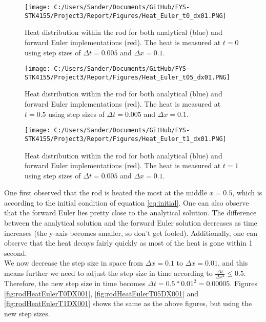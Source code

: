 \documentclass[12pt,a4paper]{article}
\begin{document}
\begin{figure}[H]
\centering
\texttt{[image: C:/Users/Sander/Documents/GitHub/FYS-STK4155/Project3/Report/Figures/Heat\_Euler\_t0\_dx01.PNG]}
\caption{\label{fig:rodHeatEulerT0DX01} Heat distribution within the rod for both analytical (blue) and forward Euler implementations (red). The heat is measured at $t = 0$ using step sizes of $\Delta t = 0.005$ and $\Delta x = 0.1$.}
\end{figure}

\begin{figure}[H]
\centering
\texttt{[image: C:/Users/Sander/Documents/GitHub/FYS-STK4155/Project3/Report/Figures/Heat\_Euler\_t05\_dx01.PNG]}
\caption{\label{fig:rodHeatEulerT05DX01} Heat distribution within the rod for both analytical (blue) and forward Euler implementations (red). The heat is measured at $t = 0.5$ using step sizes of $\Delta t = 0.005$ and $\Delta x = 0.1$.}
\end{figure}

\begin{figure}[H]
\centering
\texttt{[image: C:/Users/Sander/Documents/GitHub/FYS-STK4155/Project3/Report/Figures/Heat\_Euler\_t1\_dx01.PNG]}
\caption{\label{fig:rodHeatEulerT1DX01} Heat distribution within the rod for both analytical (blue) and forward Euler implementations (red). The heat is measured at $t = 1$ using step sizes of $\Delta t = 0.005$ and $\Delta x = 0.1$.}
\end{figure}

\noindent One first observed that the rod is heated the most at the middle $x = 0.5$, which is according to the initial condition of equation \ref{eq:initial}. One can also observe that the forward Euler lies pretty close to the analytical solution. The difference between the analytical solution and the forward Euler solution decreases as time increases (the y-axis becomes smaller, so don't get fooled). Additionally, one can observe that the heat decays fairly quickly as most of the heat is gone within 1 second. 
\\
We now decrease the step size in space from $\Delta x = 0.1$ to $\Delta x = 0.01$, and this means further we need to adjust the step size in time according to $\frac{\Delta t}{\Delta x^2} \leq 0.5$. Therefore, the new step size in time becomes $\Delta t = 0.5*0.01^2 = 0.00005$. Figures \ref{fig:rodHeatEulerT0DX001}, \ref{fig:rodHeatEulerT05DX001} and \ref{fig:rodHeatEulerT1DX001} shows the same as the above figures, but using the new step sizes.
\end{document}

